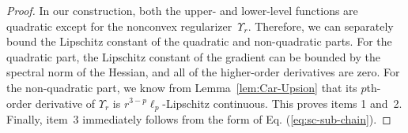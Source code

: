 \documentclass{article}
\begin{document}
\begin{proof}
In our construction, both the upper- and lower-level functions are quadratic except for the nonconvex regularizer~$\Upsilon_r$. Therefore, we can separately bound the Lipschitz constant of the quadratic and non-quadratic parts. For the quadratic part, the Lipschitz constant of the gradient can be bounded by the spectral norm of the Hessian, and all of the higher-order derivatives are zero. For the non-quadratic part, 
we know from Lemma~\ref{lem:Car-Upsion} that its $p$th-order derivative of 
$\Upsilon_r$ is $r^{3-p} \ell_p$-Lipschitz continuous.
This proves items 1 and~2.
Finally, item~3 immediately follows from the form of Eq. (\ref{eq:sc-sub-chain}).
\end{proof}
\end{document}
